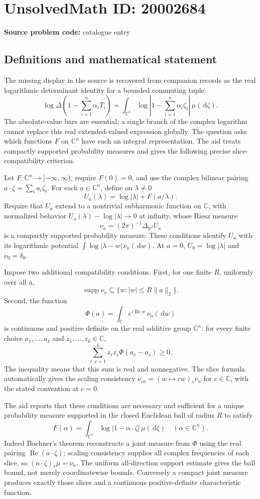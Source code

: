 \documentclass[11pt]{article}
\newcommand{\R}{\mathbb{R}}
\newcommand{\C}{\mathbb{C}}
\newcommand{\dd}{\,\mathrm{d}}
\begin{document}
\section*{UnsolvedMath ID: 20002684}
\textbf{Source problem code:} catalogue entry
\subsection{Definitions and mathematical statement}
The missing display in the source is recovered from companion records as the real logarithmic determinant identity for a bounded commuting tuple:
\[
 \log\Delta\left(1-\sum_{i=1}^n\alpha_iT_i\right)
  =\int_{\C^n}\log\left|1-\sum_{i=1}^n\alpha_i\zeta_i\right|
                    \,\mu(\dd\zeta).
\]
The absolute-value bars are essential; a single branch of the complex logarithm cannot replace this real extended-valued expression globally. The question asks which functions $F$ on $\C^n$ have such an integral representation. The aid treats compactly supported probability measures and gives the following precise slice-compatibility criterion.

Let $F:\C^n\to[-\infty,\infty)$, require $F(0)=0$, and use the complex bilinear pairing $a\cdot\zeta=\sum_i a_i\zeta_i$. For each $a\in\C^n$, define on $\lambda\ne0$
\[
 U_a(\lambda)=\log|\lambda|+F(a/\lambda).
\]
Require that $U_a$ extend to a nontrivial subharmonic function on $\C$, with normalized behavior $U_a(\lambda)-\log|\lambda|\to0$ at infinity, whose Riesz measure
\[
 \nu_a=(2\pi)^{-1}\Delta_{\R^2}U_a
\]
is a compactly supported probability measure. These conditions identify $U_a$ with its logarithmic potential $\int\log|\lambda-w|\,\nu_a(\dd w)$. At $a=0$, $U_0=\log|\lambda|$ and $\nu_0=\delta_0$.

Impose two additional compatibility conditions. First, for one finite $R$, uniformly over all $a$,
\[
 \operatorname{supp}\nu_a\subseteq\{w:|w|\le R\|a\|_2\}.
\]
Second, the function
\[
 \Phi(a)=\int_\C e^{i\operatorname{Re}w}\,\nu_a(\dd w)
\]
is continuous and positive definite on the real additive group $\C^n$: for every finite choice $a_1,\ldots,a_k$ and $z_1,\ldots,z_k\in\C$,
\[
 \sum_{r,s=1}^k z_r\overline{z_s}\Phi(a_r-a_s)\ge0.
\]
The inequality means that this sum is real and nonnegative. The slice formula automatically gives the scaling consistency $\nu_{ca}=(w\mapsto cw)_*\nu_a$ for $c\in\C$, with the stated convention at $c=0$.

The aid reports that these conditions are necessary and sufficient for a unique probability measure supported in the closed Euclidean ball of radius $R$ to satisfy
\[
 F(\alpha)=\int_{\C^n}\log|1-\alpha\cdot\zeta|\,\mu(\dd\zeta)
 \quad(\alpha\in\C^n).
\]
Indeed Bochner's theorem reconstructs a joint measure from $\Phi$ using the real pairing $\operatorname{Re}(a\cdot\zeta)$; scaling consistency supplies all complex frequencies of each slice, so $(a\cdot\zeta)_*\mu=\nu_a$. The uniform all-direction support estimate gives the ball bound, not merely coordinatewise bounds. Conversely a compact joint measure produces exactly those slices and a continuous positive-definite characteristic function.
\end{document}
